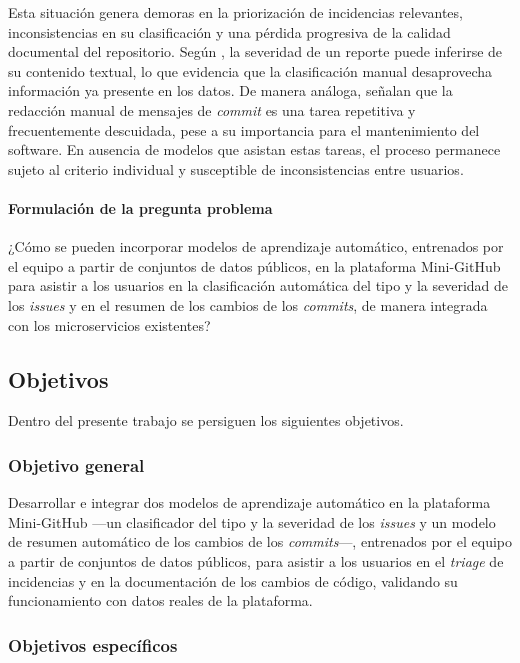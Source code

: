 Esta situación genera demoras en la priorización de incidencias relevantes, inconsistencias en su clasificación y una pérdida progresiva de la calidad documental del repositorio. Según \cite{Lamkanfi2010}, la severidad de un reporte puede inferirse de su contenido textual, lo que evidencia que la clasificación manual desaprovecha información ya presente en los datos. De manera análoga, \cite{Jiang2017} señalan que la redacción manual de mensajes de \textit{commit} es una tarea repetitiva y frecuentemente descuidada, pese a su importancia para el mantenimiento del software. En ausencia de modelos que asistan estas tareas, el proceso permanece sujeto al criterio individual y susceptible de inconsistencias entre usuarios.

\paragraph{Formulación de la pregunta problema}

¿Cómo se pueden incorporar modelos de aprendizaje automático, entrenados por el equipo a partir de conjuntos de datos públicos, en la plataforma Mini-GitHub para asistir a los usuarios en la clasificación automática del tipo y la severidad de los \textit{issues} y en el resumen de los cambios de los \textit{commits}, de manera integrada con los microservicios existentes?


\subsection{Objetivos}

Dentro del presente trabajo se persiguen los siguientes objetivos.

\subsubsection{Objetivo general}

Desarrollar e integrar dos modelos de aprendizaje automático en la plataforma Mini-GitHub —un clasificador del tipo y la severidad de los \textit{issues} y un modelo de resumen automático de los cambios de los \textit{commits}—, entrenados por el equipo a partir de conjuntos de datos públicos, para asistir a los usuarios en el \textit{triage} de incidencias y en la documentación de los cambios de código, validando su funcionamiento con datos reales de la plataforma.

\subsubsection{Objetivos específicos}

